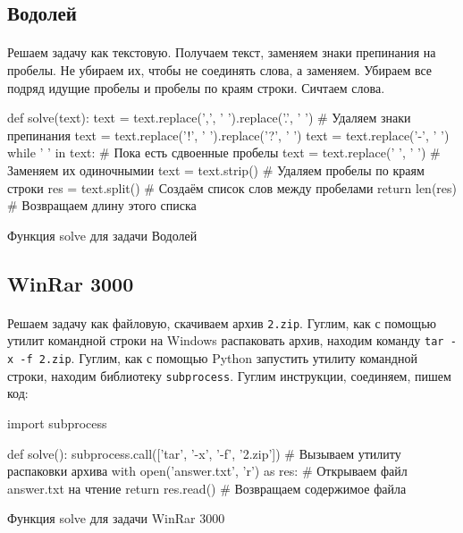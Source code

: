 \documentclass[12pt]{article}
\begin{document}
    \subsection{Водолей}
    \paragraph{}
    Решаем задачу как текстовую.
    Получаем текст, заменяем знаки препинания на пробелы.
    Не убираем их, чтобы не соединять слова, а заменяем.
    Убираем все подряд идущие пробелы и пробелы по краям строки.
    Сичтаем слова.
    \begin{listing}[H]
        \begin{pythoncode}
def solve(text):
    text = text.replace(',', ' ').replace('.', ' ')  # Удаляем знаки препинания
    text = text.replace('!', ' ').replace('?', ' ')
    text = text.replace('-', ' ')
    while '  ' in text:                              # Пока есть сдвоенные пробелы
        text = text.replace('  ', ' ')               # Заменяем их одиночнымии
    text = text.strip()                              # Удаляем пробелы по краям строки
    res = text.split()                               # Создаём список слов между пробелами
    return len(res)                                  # Возвращаем длину этого списка
        \end{pythoncode}
        \caption{Функция solve для задачи Водолей}
        \label{lst:solve1}
    \end{listing}

    \subsection{WinRar 3000}
    \paragraph{}
    Решаем задачу как файловую, скачиваем архив \verb|2.zip|.
    Гуглим, как с помощью утилит командной строки на Windows распаковать архив, находим команду \verb|tar -x -f 2.zip|.
    Гуглим, как с помощью Python запустить утилиту командной строки, находим библиотеку \verb|subprocess|.
    Гуглим инструкции, соединяем, пишем код:
    \begin{listing}[H]
        \begin{pythoncode}
import subprocess

def solve():
    subprocess.call(['tar',  '-x', '-f',  '2.zip']) # Вызываем утилиту распаковки архива
    with open('answer.txt', 'r') as res:            # Открываем файл answer.txt на чтение
        return res.read()                           # Возвращаем содержимое файла
        \end{pythoncode}
        \caption{Функция solve для задачи WinRar 3000}
        \label{lst:solve2}
    \end{listing}
\end{document}
